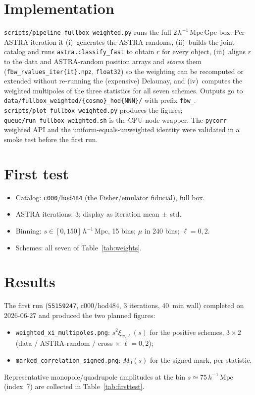 \documentclass[11pt]{article}
\newcommand{\Mpch}{\,h^{-1}\,\mathrm{Mpc}}
\newcommand{\code}[1]{\texttt{#1}}
\newcommand{\rpar}{r}
\begin{document}
\section{Implementation}
\code{scripts/pipeline\_fullbox\_weighted.py} runs the full $2\Mpch\,$Gpc box.  Per
ASTRA iteration it (i)~generates the ASTRA randoms, (ii)~builds the joint catalog
and runs \code{astra.classify\_fast} to obtain $\rpar$ for every object,
(iii)~aligns $\rpar$ to the data and ASTRA-random position arrays and \emph{stores}
them (\code{fbw\_rvalues\_iter\{it\}.npz}, \code{float32}) so the weighting can be
recomputed or extended without re-running the (expensive) Delaunay, and
(iv)~computes the weighted multipoles of the three statistics for all seven
schemes.  Outputs go to \code{data/fullbox\_weighted/\{cosmo\}\_hod\{NNN\}/} with
prefix \code{fbw\_}.  \code{scripts/plot\_fullbox\_weighted.py} produces the figures;
\code{queue/run\_fullbox\_weighted.sh} is the CPU-node wrapper.  The
\code{pycorr} weighted API and the uniform-equals-unweighted identity were
validated in a smoke test before the first run.

\section{First test}
\begin{itemize}
  \item Catalog: \code{c000}/\code{hod484} (the Fisher/emulator fiducial), full box.
  \item ASTRA iterations: $3$; display as iteration mean$\,\pm\,$std.
  \item Binning: $s\in[0,150]\Mpch$, 15 bins; $\mu$ in 240 bins; $\ell=0,2$.
  \item Schemes: all seven of Table~\ref{tab:weights}.
\end{itemize}

\section{Results}
The first run (\code{55159247}, c000/hod484, 3 iterations, $40$~min wall) completed
on 2026-06-27 and produced the two planned figures:
\begin{itemize}
  \item \code{weighted\_xi\_multipoles.png}: $s^2\xi_{w,\ell}(s)$ for the positive
        schemes, $3\times2$ (data / ASTRA-random / cross $\times$ $\ell=0,2$);
  \item \code{marked\_correlation\_signed.png}: $M_0(s)$ for the signed mark, per
        statistic.
\end{itemize}
Representative monopole/quadrupole amplitudes at the bin $s\simeq75\Mpch$ (index~7)
are collected in Table~\ref{tab:firsttest}.
\end{document}
